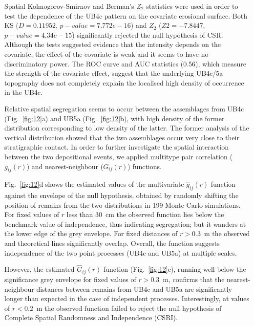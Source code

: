 \documentclass[preprint,authoryear,times]{elsarticle} %
\begin{document}
Spatial Kolmogorov-Smirnov and Berman's $Z_2$ \citep{Berman1986} statistics were used in order to test the dependence of the UB4c pattern on the covariate erosional surface. Both KS ($D=0.11952$, $p-value=7.772e-16$) and $Z_2$ ($Z2=-7.8447$, $p-value=4.34e-15$) significantly rejected the null hypothesis of CSR. Although the tests suggested evidence that the intensity depends on the covariate, the effect of the covariate is weak and it seems to have no discriminatory power. The ROC curve and AUC statistics (0.56), which measure the strength of the covariate effect, suggest that the underlying UB4c/5a topography does not completely explain the localised high density of occurrence in the UB4c.

Relative spatial segregation seems to occur between the assemblages from UB4c (Fig.~\ref{fig:12}a) and UB5a (Fig.~\ref{fig:12}b), with high density of the former distribution corresponding to low density of the latter. The former analysis of the vertical distribution showed that the two assemblages occur very close to their stratigraphic contact. In order to further investigate the spatial interaction between the two depositional events, we applied multitype pair correlation ($g_{ij}(r)$) and nearest-neighbour ($G_{ij}(r)$) functions.

Fig.~\ref{fig:12}d shows the estimated values of the multivariate $\hat{g}_{ij}(r)$ function against the envelope of the null hypothesis, obtained by randomly shifting the position of remains from the two distributions in 199 Monte Carlo simulations. For fixed values of $r$ less than 30~cm the observed function lies below the benchmark value of independence, thus indicating segregation; but it wanders at the lower edge of the grey envelope. For fixed distances of $r>0.3$~m the observed and theoretical lines significantly overlap. Overall, the function suggests independence of the two point processes (UB4c and UB5a) at multiple scales.

However, the estimated $\hat{G}_{ij}(r)$ function (Fig.~\ref{fig:12}c), running well below the significance grey envelope for fixed values of $r>0.3$~m, confirms that the nearest-neighbour distances between remains from UB4c and UB5a are significantly longer than expected in the case of independent processes. Interestingly, at values of $r<0.2$~m the observed function failed to reject the null hypothesis of Complete Spatial Randomness and Independence (CSRI).
\end{document}
